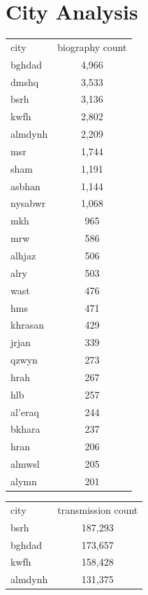 \documentclass[12pt,english]{article}
\begin{document}
\section{City Analysis}
\begin{table}[H]
\centering
\begin{tabular}{|l|c|}
\hline
\multirow{2}{1cm}{city}&\multirow{2}{2cm}{\centering biography count}\\
& \\
\hline
bghdad & 4,966 \\
\hline
dmshq & 3,533 \\
\hline
bsrh & 3,136 \\
\hline
kwfh & 2,802 \\
\hline
almdynh & 2,209 \\
\hline
msr & 1,744 \\
\hline
sham & 1,191 \\
\hline
asbhan & 1,144 \\
\hline
nysabwr & 1,068 \\
\hline
mkh & 965 \\
\hline
mrw & 586 \\
\hline
alhjaz & 506 \\
\hline
alry & 503 \\
\hline
wast & 476 \\
\hline
hms & 471 \\
\hline
khrasan & 429 \\
\hline
jrjan & 339 \\
\hline
qzwyn & 273 \\
\hline
hrah & 267 \\
\hline
hlb & 257 \\
\hline
al'eraq & 244 \\
\hline
bkhara & 237 \\
\hline
hran & 206 \\
\hline
almwsl & 205 \\
\hline
alymn & 201 \\
\hline
\end{tabular}
\quad
\begin{tabular}{|l|c|}
\hline
\multirow{2}{1cm}{city}&\multirow{2}{2.3cm}{\centering transmission count}\\
&\\
\hline
bsrh & 187,293 \\
\hline
bghdad & 173,657 \\
\hline
kwfh & 158,428 \\
\hline
almdynh & 131,375 \\

\end{tabular}
\end{table}
\end{document}
